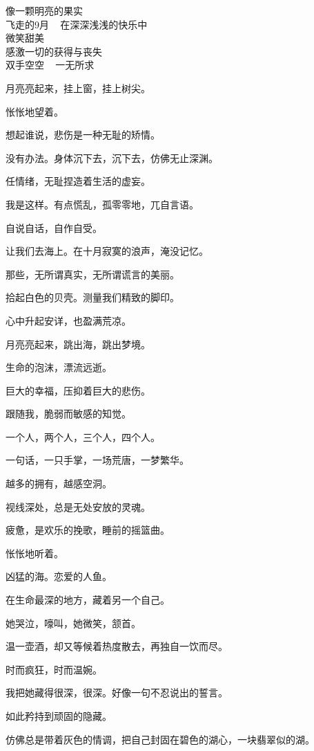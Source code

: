 	\endwriting


	\longpoem{}{}{}

		像一颗明亮的果实 \\
		飞走的9月 ~ 在深深浅浅的快乐中 \\
		微笑甜美 \\
		感激一切的获得与丧失 \\
		双手空空 ~ 一无所求

	\endlongpoem
	\endwriting



		月亮亮起来，挂上窗，挂上树尖。\par
		怅怅地望着。

		想起谁说，悲伤是一种无耻的矫情。\par
		没有办法。身体沉下去，沉下去，仿佛无止深渊。\par
		任情绪，无耻捏造着生活的虚妄。\par
		我是这样。有点慌乱，孤零零地，兀自言语。\par
		自说自话，自作自受。

		让我们去海上。在十月寂寞的浪声，淹没记忆。\par
		那些，无所谓真实，无所谓谎言的美丽。\par
		拾起白色的贝壳。测量我们精致的脚印。\par
		心中升起安详，也盈满荒凉。\par
		月亮亮起来，跳出海，跳出梦境。\par
		生命的泡沫，漂流远逝。\par
		巨大的幸福，压抑着巨大的悲伤。\par
		跟随我，脆弱而敏感的知觉。

		一个人，两个人，三个人，四个人。\par
		一句话，一只手掌，一场荒唐，一梦繁华。\par
		越多的拥有，越感空洞。\par
		视线深处，总是无处安放的灵魂。\par
		疲惫，是欢乐的挽歌，睡前的摇篮曲。

		怅怅地听着。\par
		凶猛的海。恋爱的人鱼。

	\endwriting



		在生命最深的地方，藏着另一个自己。\par
		她哭泣，嚎叫，她微笑，颔首。\par
		温一壶酒，却又等候着热度散去，再独自一饮而尽。\par
		时而疯狂，时而温婉。\par
		我把她藏得很深，很深。好像一句不忍说出的誓言。\par
		如此矜持到顽固的隐藏。\par
		仿佛总是带着灰色的情调，把自己封固在碧色的湖心，一块翡翠似的湖。

